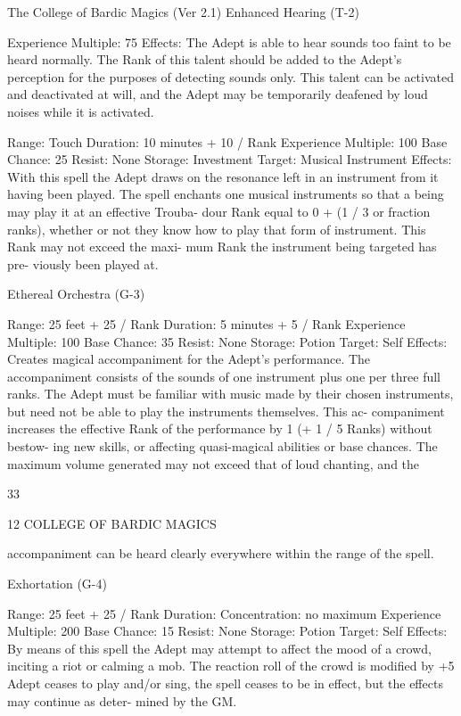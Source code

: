 \begin{Chapter}{The College of Bardic Magics (Ver 2.1)}
Enhanced Hearing (T-2) 

Experience Multiple: 75 
Effects: The Adept is able to hear sounds too faint 
to  be  heard  normally.  The  Rank  of  this  talent 
should  be  added  to  the  Adept’s  perception  for  the 
purposes  of  detecting  sounds  only.  This talent  can 
be activated and deactivated at will, and the Adept 
may be temporarily deafened by loud noises while 
it is activated. 

Range: Touch 
Duration: 10 minutes + 10 / Rank 
Experience Multiple: 100 
Base Chance: 25%
Resist: None 
Storage: Investment 
Target: Musical Instrument 
Effects:  With  this  spell  the  Adept  draws  on  the 
resonance left in an instrument from it having been 
played. The spell enchants one musical instruments 
so that a being may play it at an effective Trouba-
dour  Rank  equal  to  0  +  (1  /  3  or  fraction  ranks), 
whether or not they know how to play that form of 
instrument.  This  Rank  may  not  exceed  the  maxi-
mum  Rank  the  instrument  being  targeted  has  pre-
viously been played at. 

Ethereal Orchestra (G-3) 

Range: 25 feet + 25 / Rank 
Duration: 5 minutes + 5 / Rank 
Experience Multiple: 100 
Base Chance: 35%
Resist: None 
Storage: Potion 
Target: Self 
Effects:  Creates  magical  accompaniment  for  the 
Adept’s performance. The accompaniment consists 
of the sounds of one instrument plus one per three 
full ranks. The Adept must be familiar with music 
made by their chosen instruments, but need not be 
able  to  play  the  instruments  themselves.  This  ac-
companiment  increases  the  effective  Rank  of  the 
performance by 1 (+ 1 / 5 Ranks) without bestow-
ing  new  skills,  or  affecting  quasi-magical  abilities 
or  base  chances.  The  maximum  volume  generated 
may  not  exceed  that  of  loud  chanting,  and  the 

33 

12 COLLEGE OF BARDIC MAGICS 

accompaniment  can  be  heard  clearly  everywhere 
within the range of the spell. 

Exhortation (G-4) 

Range: 25 feet + 25 / Rank 
Duration: Concentration: no maximum 
Experience Multiple: 200 
Base Chance: 15%
Resist: None 
Storage: Potion 
Target: Self 
Effects:  By  means  of  this  spell  the  Adept  may 
attempt  to  affect  the  mood  of  a  crowd,  inciting  a 
riot  or  calming  a  mob.  The  reaction  roll  of  the 
crowd is modified by +5%
Adept ceases to play and/or sing, the spell ceases to 
be in effect, but the effects may continue as deter-
mined by the GM. 


\end{Chapter}
